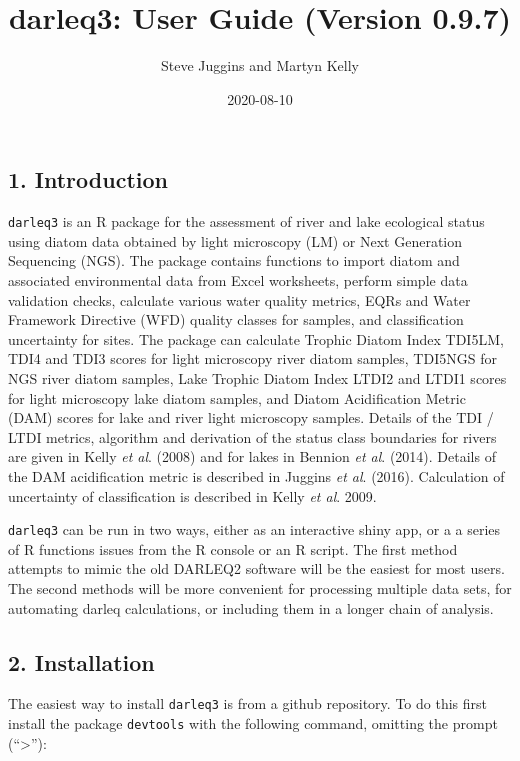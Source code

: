 \documentclass[
]{article}
\title{darleq3: User Guide (Version 0.9.7)}
\author{Steve Juggins and Martyn Kelly}
\date{2020-08-10}
\begin{document}
\maketitle

\hypertarget{introduction}{%
\subsection{1. Introduction}\label{introduction}}

\texttt{darleq3} is an R package for the assessment of river and lake
ecological status using diatom data obtained by light microscopy (LM) or
Next Generation Sequencing (NGS). The package contains functions to
import diatom and associated environmental data from Excel worksheets,
perform simple data validation checks, calculate various water quality
metrics, EQRs and Water Framework Directive (WFD) quality classes for
samples, and classification uncertainty for sites. The package can
calculate Trophic Diatom Index TDI5LM, TDI4 and TDI3 scores for light
microscopy river diatom samples, TDI5NGS for NGS river diatom samples,
Lake Trophic Diatom Index LTDI2 and LTDI1 scores for light microscopy
lake diatom samples, and Diatom Acidification Metric (DAM) scores for
lake and river light microscopy samples. Details of the TDI / LTDI
metrics, algorithm and derivation of the status class boundaries for
rivers are given in Kelly \emph{et al}. (2008) and for lakes in Bennion
\emph{et al}. (2014). Details of the DAM acidification metric is
described in Juggins \emph{et al}. (2016). Calculation of uncertainty of
classification is described in Kelly \emph{et al}. 2009.

\texttt{darleq3} can be run in two ways, either as an interactive shiny
app, or a a series of R functions issues from the R console or an R
script. The first method attempts to mimic the old DARLEQ2 software will
be the easiest for most users. The second methods will be more
convenient for processing multiple data sets, for automating darleq
calculations, or including them in a longer chain of analysis.

\hypertarget{installation}{%
\subsection{2. Installation}\label{installation}}

The easiest way to install \texttt{darleq3} is from a github repository.
To do this first install the package \texttt{devtools} with the
following command, omitting the prompt (``\textgreater{}''):
\end{document}
